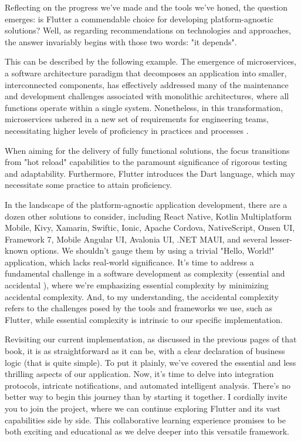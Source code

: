 
Reflecting on the progress we've made and the tools we've honed, the question emerges: is Flutter a commendable 
choice for developing platform-agnostic solutions? Well, as regarding recommendations on technologies and approaches, 
the answer invariably begins with those two words: "it depends".

This can be described by the following example.
The emergence of microservices, a software architecture paradigm that decomposes an application into smaller, 
interconnected components, has effectively addressed many of the maintenance and development challenges associated with 
monolithic architectures, where all functions operate within a single system. Nonetheless, in this transformation, 
microservices ushered in a new set of requirements for engineering teams, necessitating higher levels of proficiency in 
practices \cite{John22} and processes \cite{Mugr23}.

When aiming for the delivery of fully functional solutions, the focus transitions from "hot reload" capabilities to the 
paramount significance of rigorous testing and adaptability. Furthermore, Flutter introduces the Dart language, which 
may necessitate some practice to attain proficiency.

In the landscape of the platform-agnostic application development, there are a dozen other solutions to consider,
including React Native, Kotlin Multiplatform Mobile, Kivy, Xamarin, Swiftic, Ionic, Apache Cordova, NativeScript,
Onsen UI, Framework 7, Mobile Angular UI, Avalonia UI, .NET MAUI, and several lesser-known options. We shouldn't gauge
them by using a trivial "Hello, World!" application, which lacks real-world significance. It's time to address a
fundamental challenge in a software development as complexity (essential and accidental \cite{Broo87}), where we're
emphasizing essential complexity by minimizing accidental complexity. And, to my understanding, the accidental
complexity refers to the challenges posed by the tools and frameworks we use, such as Flutter, while essential
complexity is intrinsic to our specific implementation.

Revisiting our current implementation, as discussed in the previous pages of that book, it is as 
straightforward as it can be, with a clear declaration of business logic (that is quite simple). To put it plainly, 
we've covered the essential and less thrilling aspects of our application. Now, it's time to delve into integration 
protocols, intricate notifications, and automated intelligent analysis. There's no better way to begin this journey 
than by starting it together. I cordially invite you to join the project, where we can continue exploring Flutter and 
its vast capabilities side by side. This collaborative learning experience promises to be both exciting and educational 
as we delve deeper into this versatile framework.

